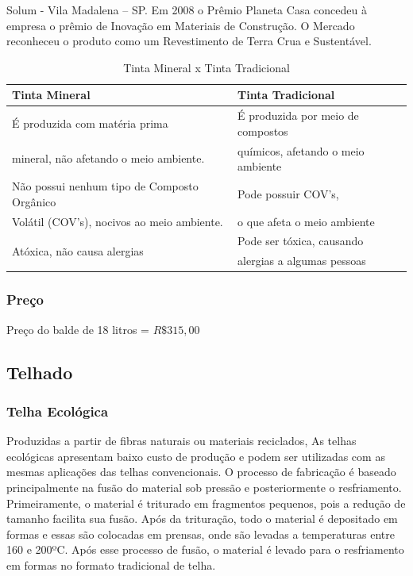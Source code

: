 	Solum - Vila Madalena – SP. Em 2008 o Prêmio Planeta Casa concedeu à empresa o prêmio de Inovação em Materiais de Construção. O Mercado reconheceu o produto como um Revestimento de Terra Crua e Sustentável.  

\begin{table}[H]
\centering
\begin{tabular}{|l|l|}
\hline 
\textbf{Tinta Mineral} & \textbf{Tinta Tradicional}\tabularnewline
\hline 
\hline 
É produzida com matéria prima & É produzida por meio de compostos \tabularnewline
mineral, não afetando o meio ambiente. & químicos, afetando o meio ambiente\tabularnewline
\hline 
Não possui nenhum tipo de Composto Orgânico  & Pode possuir COV\textquoteright{}s, \tabularnewline
Volátil (COV\textquoteright{}s), nocivos ao meio ambiente. & o que afeta o meio ambiente\tabularnewline
\hline 
\multirow{2}{*}{Atóxica, não causa alergias} & Pode ser tóxica, causando\tabularnewline
 &  alergias a algumas pessoas\tabularnewline
\hline 
\end{tabular}
\caption{Tinta Mineral x Tinta Tradicional}
\end{table}


\subsubsection*{\textbf{Preço}}

	Preço do balde de 18 litros = $R\$ 315,00$

\subsection{Telhado}

\subsubsection*{\textbf{Telha Ecológica}}

	Produzidas a partir de fibras naturais ou materiais reciclados, As telhas ecológicas apresentam baixo custo de produção e podem ser utilizadas com as mesmas aplicações das telhas convencionais.
	O processo de fabricação é baseado principalmente na fusão do material sob pressão e posteriormente o resfriamento. Primeiramente, o material é triturado em fragmentos pequenos, pois a redução de tamanho facilita sua fusão. Após da trituração, todo o material é depositado em formas e essas são colocadas em prensas, onde são levadas a temperaturas entre 160 e 200ºC. Após esse processo de fusão, o material é levado para o resfriamento em formas no formato tradicional de telha.\cite{D.C.Araujo}

